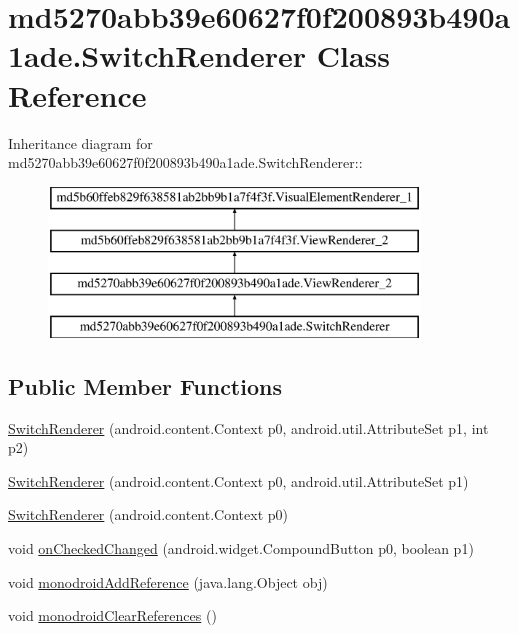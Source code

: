 \hypertarget{classmd5270abb39e60627f0f200893b490a1ade_1_1_switch_renderer}{
\section{md5270abb39e60627f0f200893b490a1ade.SwitchRenderer Class Reference}
\label{classmd5270abb39e60627f0f200893b490a1ade_1_1_switch_renderer}
}
Inheritance diagram for md5270abb39e60627f0f200893b490a1ade.SwitchRenderer::\begin{figure}[H]
\begin{center}
\leavevmode
\includegraphics[height=4cm]{classmd5270abb39e60627f0f200893b490a1ade_1_1_switch_renderer}
\end{center}
\end{figure}
\subsection*{Public Member Functions}
\begin{CompactItemize}
\item 
\hyperlink{classmd5270abb39e60627f0f200893b490a1ade_1_1_switch_renderer_28d4f09146c66b0991594aa4e5b0f7ff}{SwitchRenderer} (android.content.Context p0, android.util.AttributeSet p1, int p2)
\item 
\hyperlink{classmd5270abb39e60627f0f200893b490a1ade_1_1_switch_renderer_2dc3f9d51a00b56ed319cbf9b5dab267}{SwitchRenderer} (android.content.Context p0, android.util.AttributeSet p1)
\item 
\hyperlink{classmd5270abb39e60627f0f200893b490a1ade_1_1_switch_renderer_ea0207fcf836b5f128c00a9bfabce2cb}{SwitchRenderer} (android.content.Context p0)
\item 
void \hyperlink{classmd5270abb39e60627f0f200893b490a1ade_1_1_switch_renderer_ef153bafa3b4b8c95620b6c59d403578}{onCheckedChanged} (android.widget.CompoundButton p0, boolean p1)
\item 
void \hyperlink{classmd5270abb39e60627f0f200893b490a1ade_1_1_switch_renderer_363c621199304e433d9aec4e62dfb8fa}{monodroidAddReference} (java.lang.Object obj)
\item 
void \hyperlink{classmd5270abb39e60627f0f200893b490a1ade_1_1_switch_renderer_269d9c853effc1c0864414f6ee8130f3}{monodroidClearReferences} ()
\end{CompactItemize}
